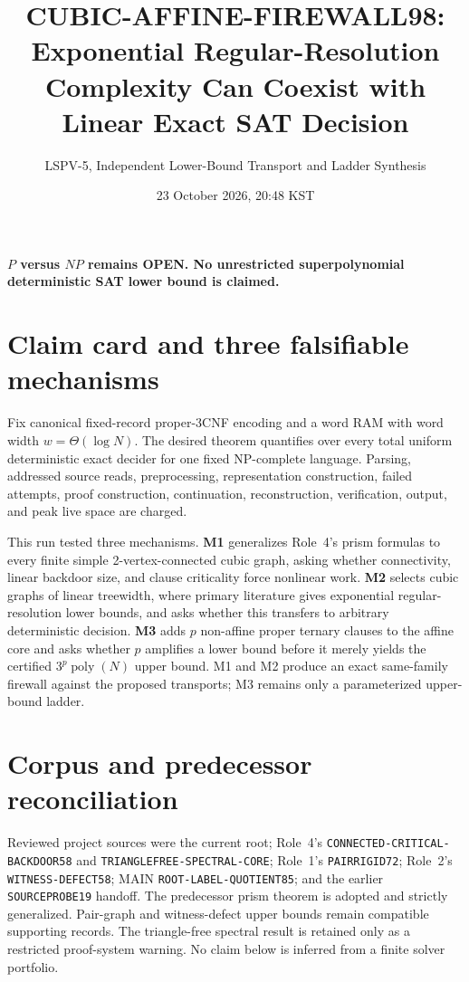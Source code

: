 \documentclass[11pt]{article}
\title{CUBIC-AFFINE-FIREWALL98: Exponential Regular-Resolution Complexity Can Coexist with Linear Exact SAT Decision}
\author{LSPV-5, Independent Lower-Bound Transport and Ladder Synthesis}
\date{23 October 2026, 20:48 KST}
\begin{document}
\maketitle
\begin{center}\textbf{$P$ versus $NP$ remains OPEN. No unrestricted superpolynomial deterministic SAT lower bound is claimed.}\end{center}

\section{Claim card and three falsifiable mechanisms}
Fix canonical fixed-record proper-3CNF encoding and a word RAM with word width $w=\Theta(\log N)$. The desired theorem quantifies over every total uniform deterministic exact decider for one fixed NP-complete language. Parsing, addressed source reads, preprocessing, representation construction, failed attempts, proof construction, continuation, reconstruction, verification, output, and peak live space are charged.

This run tested three mechanisms. \textbf{M1} generalizes Role~4's prism formulas to every finite simple 2-vertex-connected cubic graph, asking whether connectivity, linear backdoor size, and clause criticality force nonlinear work. \textbf{M2} selects cubic graphs of linear treewidth, where primary literature gives exponential regular-resolution lower bounds, and asks whether this transfers to arbitrary deterministic decision. \textbf{M3} adds $p$ non-affine proper ternary clauses to the affine core and asks whether $p$ amplifies a lower bound before it merely yields the certified $3^p\operatorname{poly}(N)$ upper bound. M1 and M2 produce an exact same-family firewall against the proposed transports; M3 remains only a parameterized upper-bound ladder.

\section{Corpus and predecessor reconciliation}
Reviewed project sources were the current root; Role~4's \texttt{CONNECTED-CRITICAL-BACKDOOR58} and \texttt{TRIANGLEFREE-SPECTRAL-CORE}; Role~1's \texttt{PAIRRIGID72}; Role~2's \texttt{WITNESS-DEFECT58}; MAIN \texttt{ROOT-LABEL-QUOTIENT85}; and the earlier \texttt{SOURCEPROBE19} handoff. The predecessor prism theorem is adopted and strictly generalized. Pair-graph and witness-defect upper bounds remain compatible supporting records. The triangle-free spectral result is retained only as a restricted proof-system warning. No claim below is inferred from a finite solver portfolio.
\end{document}
